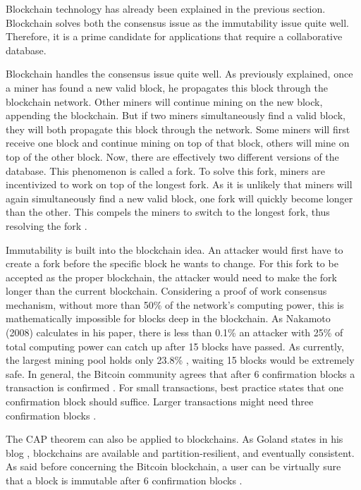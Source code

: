 Blockchain technology has already been explained in the previous section. Blockchain solves both the consensus issue as the immutability issue quite well. Therefore, it is a prime candidate for applications that require a collaborative database.

Blockchain handles the consensus issue quite well. As previously explained, once a miner has found a new valid block, he propagates this block through the blockchain network. Other miners will continue mining on the new block, appending the blockchain. But if two miners simultaneously find a valid block, they will both propagate this block through the network. Some miners will first receive one block and continue mining on top of that block, others will mine on top of the other block. Now, there are effectively two different versions of the database. This phenomenon is called a fork. To solve this fork, miners are incentivized to work on top of the longest fork. As it is unlikely that miners will again simultaneously find a new valid block, one fork will quickly become longer than the other. This compels the miners to switch to the longest fork, thus resolving the fork \cite{antonopoulos:2014}. 


Immutability is built into the blockchain idea. An attacker would first have to create a fork before the specific block he wants to change. For this fork to be accepted as the proper blockchain, the attacker would need to make the fork longer than the current blockchain. Considering a proof of work consensus mechanism, without more than 50\% of the network's computing power, this is mathematically impossible for blocks deep in the blockchain. As Nakamoto (2008) calculates in his paper, there is less than 0.1\% an attacker with 25\% of total computing power can catch up after 15 blocks have passed. As currently, the largest mining pool holds only 23.8\% \cite{hashrate-distribution}, waiting 15 blocks would be extremely safe. In general, the Bitcoin community agrees that after 6 confirmation blocks a transaction is confirmed \cite{Bitcoin-confirmation-amount}. For small transactions, best practice states that one confirmation block should suffice. Larger transactions might need three confirmation blocks \cite{confirmation-safety}.


The CAP theorem can also be applied to blockchains. As Goland states in his blog \cite{blockchain-cap}, blockchains are available and partition-resilient, and eventually consistent. As said before concerning the Bitcoin blockchain, a user can be virtually sure that a block is immutable after 6 confirmation blocks \cite{Bitcoin-confirmation-amount}.

